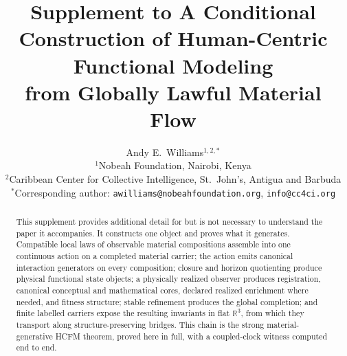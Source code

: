 \documentclass[11pt]{article}
\title{Supplement to A Conditional Construction of Human-Centric Functional Modeling\\
from Globally Lawful Material Flow}
\author{Andy E.\ Williams$^{1,2,*}$\\[4pt]
\small $^1$Nobeah Foundation, Nairobi, Kenya\\
\small $^2$Caribbean Center for Collective Intelligence, St.\ John's, Antigua and Barbuda\\[2pt]
\small $^*$Corresponding author: \texttt{awilliams@nobeahfoundation.org}, \texttt{info@cc4ci.org}}
\date{}
\theoremstyle{definition}
\begin{document}
\maketitle

\begin{abstract}
This supplement provides additional detail for but is not necessary to understand the paper it accompanies. It constructs one object and proves what it generates. Compatible local laws of observable material compositions assemble into one continuous action on a completed material carrier; the action emits canonical interaction generators on every composition; closure and horizon quotienting produce physical functional state objects; a physically realized observer produces registration, canonical conceptual and mathematical cores, declared realized enrichment where needed, and fitness structure; stable refinement produces the global completion; and finite labelled carriers expose the resulting invariants in flat $\mathbb{R}^3$, from which they transport along structure-preserving bridges. This chain is the strong material-generative HCFM theorem, proved here in full, with a coupled-clock witness computed end to end.


\end{abstract}
\end{document}
